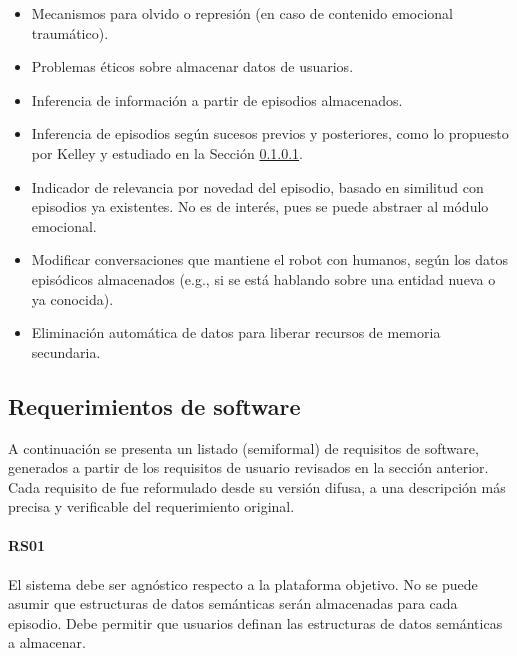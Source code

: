 \begin{itemize}
\item Mecanismos para olvido o represión (en caso de contenido emocional traumático).
\item Problemas éticos sobre almacenar datos de usuarios.
\item Inferencia de información a partir de episodios almacenados.
\item Inferencia de episodios según sucesos previos y posteriores, como lo propuesto por Kelley \cite{Kelley2014} y estudiado en la Sección \ref{}.
\item Indicador de relevancia por novedad del episodio, basado en similitud con episodios ya existentes. No es de interés, pues se puede abstraer al módulo emocional.
\item Modificar conversaciones que mantiene el robot con humanos, según los datos episódicos almacenados (e.g., si se está hablando sobre una entidad nueva o ya conocida).
\item Eliminación automática de datos para liberar recursos de memoria secundaria.
\end{itemize}

\subsection{Requerimientos de software}

A continuación se presenta un listado (semiformal) de requisitos de software, generados a partir de los requisitos de usuario revisados en la sección anterior. Cada requisito de fue reformulado desde su versión difusa, a una descripción más precisa y verificable del requerimiento original. 

\paragraph{RS01}
El sistema debe ser agnóstico respecto a la plataforma objetivo. No se puede asumir que estructuras de datos semánticas serán almacenadas para cada episodio. Debe permitir que usuarios definan las estructuras de datos semánticas a almacenar.

